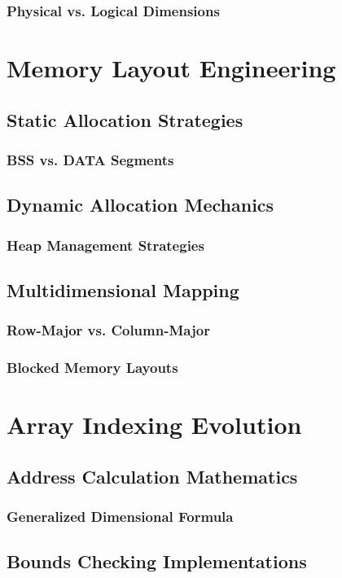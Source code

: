 \documentclass[12pt, oneside]{book}
\begin{document}
	 \subsection{Physical vs. Logical Dimensions}
	 
	 \chapter{Memory Layout Engineering}
	 \section{Static Allocation Strategies}
	 \subsection{BSS vs. DATA Segments}
	 \section{Dynamic Allocation Mechanics}
	 \subsection{Heap Management Strategies}
	 \section{Multidimensional Mapping}
	 \subsection{Row-Major vs. Column-Major}
	 \subsection{Blocked Memory Layouts}
	 
	 \chapter{Array Indexing Evolution}
	 \section{Address Calculation Mathematics}
	 \subsection{Generalized Dimensional Formula}
	 \section{Bounds Checking Implementations}
\end{document}

